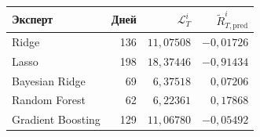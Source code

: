 \begin{tabular}{@{}lrrr@{}}
\toprule
Эксперт & Дней & $\mathcal L_T^i$ & $\widetilde R_{T,\mathrm{pred}}^i$ \\
\midrule
Ridge & 136 & $11{,}07508$ & $-0{,}01726$ \\
Lasso & 198 & $18{,}37446$ & $-0{,}91434$ \\
Bayesian Ridge & 69 & $6{,}37518$ & $0{,}07206$ \\
Random Forest & 62 & $6{,}22361$ & $0{,}17868$ \\
Gradient Boosting & 129 & $11{,}06780$ & $-0{,}05492$ \\
\bottomrule
\end{tabular}
